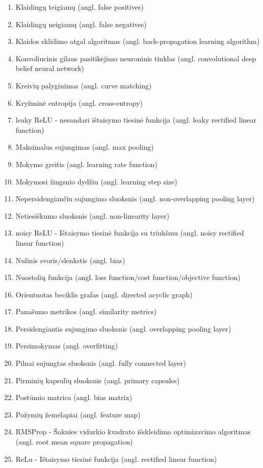 \begin{enumerate}
	\item Klaidingų teigiamų (angl. false positives)
	\item Klaidingų neigiamų (angl. false negatives)
	\item Klaidos sklidimo atgal algoritmas (angl. back-propagation learning algorithm)
	\item Konvoliucinis gilaus pasitikėjimo neuroninis tinklas (angl. convolutional deep belief neural network)
	\item Kreivių palyginimas (angl. curve matching)
	\item Kryžminė entropija (angl. cross-entropy)
	\item leaky ReLU - nesandari ištaisymo tiesinė funkcija (angl. leaky rectified linear function)
	\item Maksimalus sujungimas (angl. max pooling)
	\item Mokymo greitis (angl. learning rate function)
	\item Mokymosi žingsnio dydžiu (angl. learning step size)
	\item Nepersidengiančiu sujungimo sluoksnis (angl. non-overlapping pooling layer)
	\item Netiesiškumo sluoksnis (angl. non-linearity layer)
	\item noisy ReLU - Ištaisymo tiesinė funkcija su triukšmu (angl. noisy rectified linear function)
	\item Nulinis svoris/slenkstis (angl. bias)
	\item Nuostolių funkcija (angl. loss function/cost function/objective function)
	\item Orientuotas beciklis grafas (angl. directed acyclic graph)
	\item Panašumo metrikos (angl. similarity metrics)
	\item Persidengiantis sujungimo sluoksnis (angl. overlapping pooling layer)
	\item Persimokymas (angl. overfitting)
	\item Pilnai sujungtas sluoksnis (angl. fully connected layer)
	\item Pirminių kapsulių sluoksnis (angl. primary capsules)
	\item Postūmio matrica (angl. bias matrix)
	\item Požymių žemėlapiai (angl. feature map)
	\item RMSProp - Šaknies vidurkio kvadrato išskleidimo optimizavimo algoritmas (angl. root mean square propagation)
	\item ReLu - Ištaisymo tiesinė funkcija (angl. rectified linear function)

\end{enumerate}
